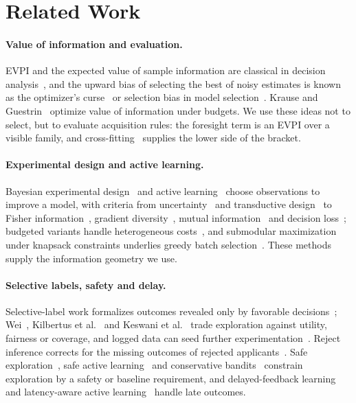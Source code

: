 \documentclass[runningheads]{llncs}
\begin{document}
\section{Related Work}
\label{sec:related}
\paragraph{Value of information and evaluation.} EVPI and the expected value of sample information are classical in decision analysis~\cite{howard1966information,raiffa1961applied}, and the upward bias of selecting the best of noisy estimates is known as the optimizer's curse~\cite{smith2006optimizer} or selection bias in model selection~\cite{cawley2010overfitting}. Krause and Guestrin~\cite{krause2005near} optimize value of information under budgets. We use these ideas not to select, but to evaluate acquisition rules: the foresight term is an EVPI over a visible family, and cross-fitting~\cite{chernozhukov2018double} supplies the lower side of the bracket.

\paragraph{Experimental design and active learning.} Bayesian experimental design~\cite{chaloner1995bayesian} and active learning~\cite{cohn1996active,settles2009active} choose observations to improve a model, with criteria from uncertainty~\cite{lewis1994sequential} and transductive design~\cite{yu2006transductive} to Fisher information~\cite{ash2021fishing}, gradient diversity~\cite{ash2020badge}, mutual information~\cite{kirsch2019batchbald,bickfordsmith2023prediction} and decision loss~\cite{huang2026loss}; budgeted variants handle heterogeneous costs~\cite{tomanek2010cost,morato2025conbatch}, and submodular maximization under knapsack constraints underlies greedy batch selection~\cite{sviridenko2004note}. These methods supply the information geometry we use.

\paragraph{Selective labels, safety and delay.} Selective-label work formalizes outcomes revealed only by favorable decisions~\cite{lakkaraju2017selective}; Wei~\cite{wei2021selective}, Kilbertus et al.~\cite{kilbertus2020fair} and Keswani et al.~\cite{keswani2024partial} trade exploration against utility, fairness or coverage, and logged data can seed further experimentation~\cite{yan2018logged}. Reject inference corrects for the missing outcomes of rejected applicants~\cite{crook2004reject}. Safe exploration~\cite{sui2015safe}, safe active learning~\cite{schreiter2015safe} and conservative bandits~\cite{wu2016conservative} constrain exploration by a safety or baseline requirement, and delayed-feedback learning~\cite{joulani2013delayed,chapelle2014delayed} and latency-aware active learning~\cite{pham2022latency} handle late outcomes. 
\end{document}
